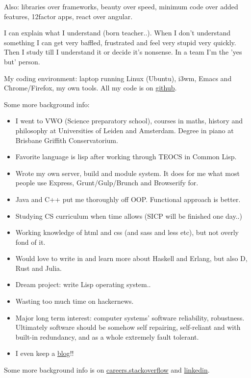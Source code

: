 \documentclass[11pt]{article}
\begin{document}
Also: libraries over frameworks, beauty over speed, minimum code over added features, 12factor apps, react over angular.

I can explain what I understand (born teacher..). When I don't understand something I can get very baffled, frustrated and feel very stupid very quickly. Then I study till I understand it or decide it's nonsense. In a team I'm the 'yes but' person. 

My coding environment: laptop running Linux (Ubuntu), i3wm, Emacs and Chrome/Firefox, my own tools. All my code is on \href{http://github.com/michieljoris}{github}.

Some more background info:

\begin{itemize}
\item I went to VWO (Science preparatory school), courses in maths, history and philosophy at Universities of Leiden and Amsterdam. Degree in piano at Brisbane Griffith Conservatorium.
\item Favorite language is lisp after working through TEOCS in Common Lisp.
\item Wrote my own server, build and module system. It does for me what most people use Express, Grunt/Gulp/Brunch and Browserify for.
\item Java and C++ put me thoroughly off OOP. Functional approach is better.
\item Studying CS curriculum when time allows (SICP will be finished one day..)
\item Working knowledge of html and css (and sass and less etc), but not overly fond of it.
\item Would love to write in and learn more about Haskell and Erlang, but also D, Rust and Julia.
\item Dream project: write Lisp operating system..
\item Wasting too much time on hackernews.
\item Major long term interest: computer systems' software reliability, robustness. Ultimately
software should be somehow self repairing, self-reliant and with built-in
redundancy, and as a whole extremely fault tolerant.
\item I even keep a \href{http://www.axion5.net}{blog}!!
\end{itemize}

Some more background info is on \href{http://careers.stackoverflow.com/michieljoris}{careers.stackoverflow} and \href{http://nl.linkedin.com/in/michieljoris/}{linkedin}.

\end{document}
